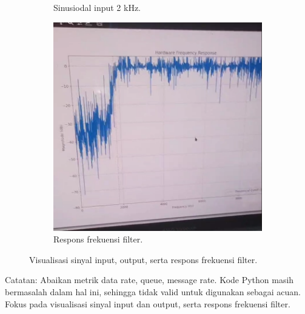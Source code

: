 \documentclass[a4paper,12pt]{article}
\begin{document}
\begin{figure}[H]
\begin{subfigure}[b]{0.3\textwidth}
        \caption{Sinusiodal input 2 kHz.}
    \end{subfigure}
    \hfill
    \begin{subfigure}[b]{0.3\textwidth}
        \includegraphics[width=\textwidth]{images/freq_response_real.png}
        \caption{Respons frekuensi filter.}
    \end{subfigure}
    \caption{Visualisasi sinyal input, output, serta respons frekuensi filter.}
\end{figure}

\noindent Catatan: Abaikan metrik data rate, queue, message rate. Kode Python masih bermasalah dalam hal ini,
sehingga tidak valid untuk digunakan sebagai acuan. Fokus pada visualisasi sinyal input dan output,
serta respons frekuensi filter.
\end{document}

